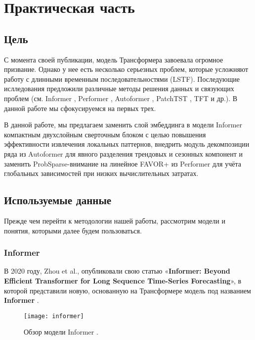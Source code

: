 \section{Практическая часть}

\subsection{Цель}

С момента своей публикации, модель Трансформера \cite{vaswani2017attention}
завоевала огромное призвание. Однако у нее есть несколько серьезных 
проблем, которые усложняют работу с длинными временным последовательностями 
(LSTF). Последующие ислледования предложили различные методы решения 
данных и связующих проблем (см. Informer \cite{informer}, Performer \cite{performer}, 
Autoformer \cite{autoformer}, PatchTST \cite{patchTST}, TFT \cite{TFT} и др.). 
В данной работе мы сфокусируемся на первых трех.

В данной работе, мы предлагаем заменить слой эмбеддинга в модели 
Informer компактным двухслойным сверточным блоком с целью повышения 
эффективности извлечения локальных паттернов, внедрить модуль 
декомпозиции ряда из Autoformer для явного разделения 
трендовых и сезонных компонент и заменить ProbSparse-внимание 
на линейное FAVOR+ из Performer для учёта глобальных 
зависимостей при низких вычислительных затратах.

\subsection{Используемые данные}

Прежде чем перейти к методологии нашей работы, рассмотрим 
модели и понятия, которыми далее будем пользоваться.

\subsubsection{Informer}

В 2020 году, Zhou et al., опубликовали свою статью 
«\textbf{Informer: Beyond Efficient Transformer for 
Long Sequence Time-Series Forecasting}», в которой 
представили новую, основанную на Трансформере \cite{vaswani2017attention} 
модель под названием \textbf{Informer} \cite{informer}. 

\begin{figure}[h!]
    \centering
    \texttt{[image: informer]}
    \caption{Обзор модели Informer \cite{informer}.}
    \label{fig:informer}
\end{figure}

